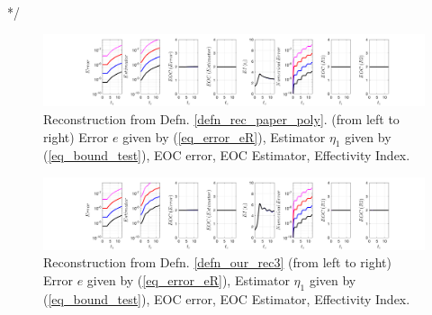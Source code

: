 \documentclass[12pt,a4paper]{article}
\numberwithin{equation}{section}
\theoremstyle{definition}
\begin{document}
*/
\begin{figure}[H]
	\hspace{-3cm}
	\includegraphics[scale=0.55]{fig_LeapFrogplots_1x5_sin_IC_harmonic_u5_v5_paperrec_poly_our_res}	
		\caption{Reconstruction from Defn. \ref{defn_rec_paper_poly}. (from left to right) Error $e$ given by (\ref{eq_error_eR}), Estimator $\eta_1$ given by (\ref{eq_bound_test}), EOC error, EOC Estimator, Effectivity Index.}
	\label{fig_all_in_one_paperrec_poly_u05_v05}
\end{figure}
\begin{figure}[H]
	\hspace{-3cm}
	\includegraphics[scale=0.55]{fig_LeapFrogplots_1x5_sin_IC_harmonic_u5_v5_paperrec_poly_tristan}	
\caption{Reconstruction from Defn. \ref{defn_our_rec3} (from left to right) Error $e$ given by (\ref{eq_error_eR}), Estimator $\eta_1$ given by (\ref{eq_bound_test}), EOC error, EOC Estimator, Effectivity Index.}
	\label{fig_all_in_one_paperrec_poly_tristan_u5_v5}
\end{figure}
\end{document}
